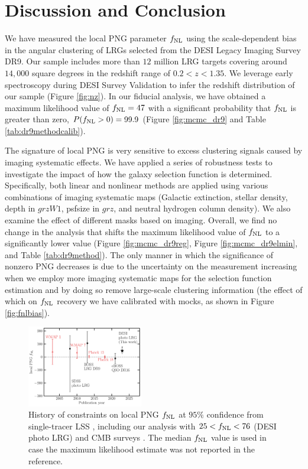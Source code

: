 \section{Discussion and Conclusion}\label{sec:conclusion}

We have measured the local PNG parameter $f_{\rm NL}$ using the scale-dependent bias in the angular clustering of LRGs selected from the DESI Legacy Imaging Survey DR9. Our sample includes more than $12$ million LRG targets covering around $14,000$ square degrees in the redshift range of $0.2< z < 1.35$. We leverage early spectroscopy during DESI Survey Validation \citep{desi2023sv} to infer the redshift distribution of our sample (Figure \ref{fig:nz}). In our fiducial analysis, we have obtained a maximum likelihood value of $f_{\rm NL}=47$ with a significant probability that $f_{\rm NL}$ is greater than zero, $P(f_{\rm NL}>0)=99.9$ (Figure \ref{fig:mcmc_dr9} and Table \ref{tab:dr9methodcalib}). 

The signature of local PNG is very sensitive to excess clustering signals caused by imaging systematic effects. We have applied a series of robustness tests to investigate the impact of how the galaxy selection function is determined. Specifically, both linear and nonlinear methods are applied using various combinations of imaging systematic maps (Galactic extinction, stellar density, depth in $grzW1$, psfsize in $grz$, and neutral hydrogen column density). We also examine the effect of different masks based on imaging. Overall, we find no change in the analysis that shifts the maximum likelihood value of $f_{\rm NL}$ to a significantly lower value (Figure \ref{fig:mcmc_dr9reg}, Figure \ref{fig:mcmc_dr9elmin}, and Table \ref{tab:dr9method}). The only manner in which the significance of nonzero PNG decreases is due to the uncertainty on the measurement increasing when we employ more imaging systematic maps for the selection function estimation and by doing so remove large-scale clustering information (the effect of which on $f_{\rm NL}$ recovery we have calibrated with mocks, as shown in Figure \ref{fig:fnlbias}).

\begin{figure}
    \centering
    \includegraphics[width=0.45\textwidth]{figures/fnl_history.pdf}
    \caption{History of constraints on local PNG $f_{\rm NL}$ at $95\%$ confidence from single-tracer LSS \citep{slosar2008constraints,2013MNRAS.428.1116R, mueller2022primordial}, including our analysis with $25<f_{\rm NL}<76$ (DESI photo LRG) and CMB surveys \citep{Komatsu_2003, Komatsu_2010, planck13, akrami2019planck}. The median $f_{\rm NL}$ value is used in case the maximum likelihood estimate was not reported in the reference.}
    \label{fig:fnlhist}
\end{figure}


